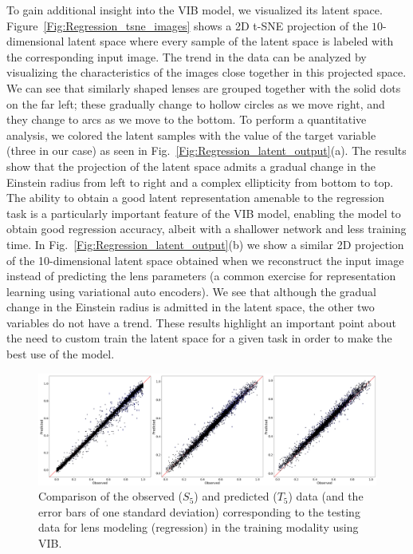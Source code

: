 \documentclass[12pt, twocolumn, apj]{openjournal}
\begin{document}
To gain additional insight into the VIB model, we visualized its latent space. Figure~\ref{Fig:Regression_tsne_images} shows a 2D t-SNE projection of the $10$-dimensional latent space where every sample of the latent space is labeled with the corresponding input image. The trend in the data can be analyzed by visualizing the characteristics of the images close together in this projected space. We can see that similarly shaped lenses are grouped together with the solid dots on the far left; these gradually change to hollow circles as we move right, and they change to arcs as we move to the bottom. To perform a quantitative analysis, we colored the latent samples with the value of the target variable (three in our case) as seen in Fig.~\ref{Fig:Regression_latent_output}(a). The results show that the projection of the latent space admits a gradual change in the Einstein radius from left to right and a complex ellipticity from bottom to top. The ability to obtain a good latent representation amenable to the regression task is a particularly important feature of the VIB model, enabling the model to obtain good regression accuracy, albeit with a shallower network and less training time. In Fig.~\ref{Fig:Regression_latent_output}(b) we show a similar 2D projection of the 10-dimensional latent space obtained when we reconstruct the input image instead of predicting the lens parameters (a common exercise for representation learning using variational auto encoders). We see that although the gradual change in the Einstein radius is admitted in the latent space, the other two variables do not have a trend. These results highlight an important point about the need to custom train the latent space for a given task in order to make the best use of the model. 

\begin{figure}[!tp]
\centering
\includegraphics[width=\linewidth]{Figures/UQ_Monte_Carlo2.png}
\caption{Comparison of the observed ($S_5$) and predicted ($T_5$) data (and the error bars of one standard deviation) corresponding to the testing data for lens modeling (regression) in the training modality using VIB.}
\label{Fig:Regression_train} 
\end{figure}
\end{document}
